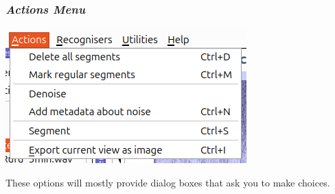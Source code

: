 \documentclass{article}
\begin{document}
\subsubsection{{\em Actions Menu}}
\label{sec:action}

\begin{center}
\includegraphics[width=.4\textwidth]{Figures/ActionsMenu}
\end{center}

These options will mostly provide dialog boxes that ask you to make choices. 
\end{document}
